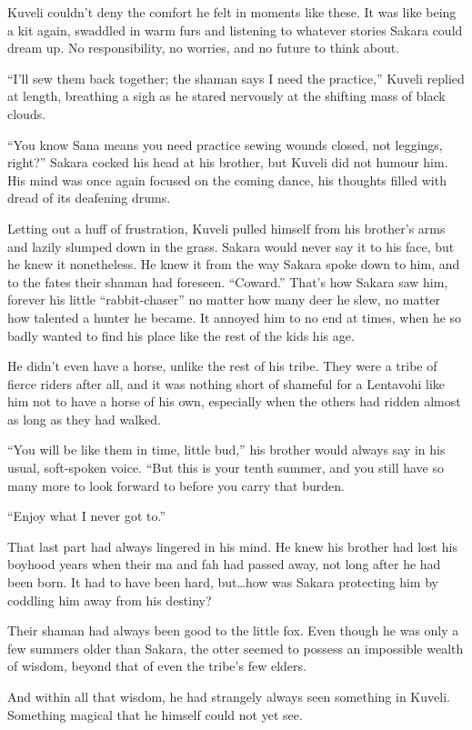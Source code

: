 Kuveli couldn't deny the comfort he felt in moments like these. It was like being a kit again, swaddled in warm furs and listening to whatever stories Sakara could dream up. No responsibility, no worries, and no future to think about.

``I'll sew them back together; the shaman says I need the practice,'' Kuveli replied at length, breathing a sigh as he stared nervously at the shifting mass of black clouds.

``You know Sana means you need practice sewing wounds closed, not leggings, right?'' Sakara cocked his head at his brother, but Kuveli did not humour him. His mind was once again focused on the coming dance, his thoughts filled with dread of its deafening drums.

Letting out a huff of frustration, Kuveli pulled himself from his brother's arms and lazily slumped down in the grass. Sakara would never say it to his face, but he knew it nonetheless. He knew it from the way Sakara spoke down to him, and to the fates their shaman had foreseen. ``Coward.'' That's how Sakara saw him, forever his little ``rabbit-chaser'' no matter how many deer he slew, no matter how talented a hunter he became. It annoyed him to no end at times, when he so badly wanted to find his place like the rest of the kids his age.

He didn't even have a horse, unlike the rest of his tribe. They were a tribe of fierce riders after all, and it was nothing short of shameful for a Lentavohi like him not to have a horse of his own, especially when the others had ridden almost as long as they had walked.

``You will be like them in time, little bud,'' his brother would always say in his usual, soft-spoken voice. ``But this is your tenth summer, and you still have so many more to look forward to before you carry that burden.

``Enjoy what I never got to.''

That last part had always lingered in his mind. He knew his brother had lost his boyhood years when their ma and fah had passed away, not long after he had been born. It had to have been hard, but\ldots{}how was Sakara protecting him by coddling him away from his destiny?

Their shaman had always been good to the little fox. Even though he was only a few summers older than Sakara, the otter seemed to possess an impossible wealth of wisdom, beyond that of even the tribe's few elders.

And within all that wisdom, he had strangely always seen something in Kuveli. Something magical that he himself could not yet see.

